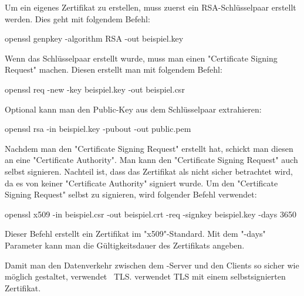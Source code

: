 \pagebreak


Um ein eigenes Zertifikat zu erstellen, muss zuerst ein RSA-Schlüsselpaar erstellt werden. Dies geht mit folgendem Befehl:

{\ttfamily openssl genpkey -algorithm RSA -out beispiel.key}

Wenn das Schlüsselpaar erstellt wurde, muss man einen "Certificate Signing Request" machen. Diesen erstellt man mit folgendem Befehl: 

{\ttfamily openssl req -new -key beispiel.key -out beispiel.csr}

Optional kann man den Public-Key aus dem Schlüsselpaar extrahieren:

{\ttfamily openssl rsa -in beispiel.key -pubout -out public.pem}

Nachdem man den "Certificate Signing Request" erstellt hat, schickt man diesen an eine "Certificate Authority". Man kann den "Certificate Signing Request" auch selbst signieren. Nachteil ist, dass das Zertifikat als nicht sicher betrachtet wird, da es von keiner "Certificate Authority" signiert wurde. Um den "Certificate Signing Request" selbst zu signieren, wird folgender Befehl verwendet: 

{\ttfamily openssl x509 -in beispiel.csr -out beispiel.crt -req -signkey beispiel.key -days 3650}

Dieser Befehl erstellt ein Zertifikat im "x509"-Standard. Mit dem "-days" Parameter kann man die Gültigkeitsdauer des Zertifikats angeben. \cite{ZertifikateTLS}


Damit man den Datenverkehr zwischen dem \ZELIA-Server und den Clients so sicher wie möglich gestaltet, verwendet \ZELIA\ TLS. \ZELIA verwendet TLS mit einem selbstsignierten Zertifikat.
